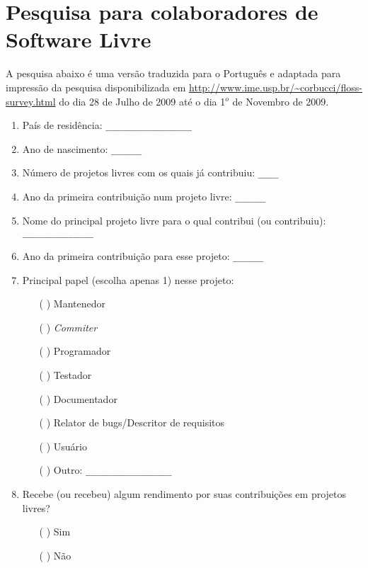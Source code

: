 \chapter{Pesquisa para colaboradores de Software Livre}
\label{ape:OS}

\singlespacing

A pesquisa abaixo é uma versão traduzida para o Português e adaptada
para impressão da pesquisa disponibilizada em
\url{http://www.ime.usp.br/~corbucci/floss-survey.html} do dia 28 de
Julho de 2009 até o dia 1$^o$ de Novembro de 2009.

\begin{enumerate}
\item País de residência: \verb=_________________=

\item Ano de nascimento: \verb=______=

\item Número de projetos livres com os quais já contribuiu:
  \verb=____=

\item Ano da primeira contribuição num projeto livre: \verb=______=

\item Nome do principal projeto livre para o qual contribui (ou
  contribuiu): \verb= ______________=

\item Ano da primeira contribuição para esse projeto: \verb=______=

\item Principal papel (escolha apenas 1) nesse projeto:
  \begin{itemize}
  \item[( )] Mantenedor
  \item[( )] \textit{Commiter}
  \item[( )] Programador
  \item[( )] Testador
  \item[( )] Documentador
  \item[( )] Relator de bugs/Descritor de requisitos
  \item[( )] Usuário
  \item[( )] Outro: \verb=_________________=
  \end{itemize}

\item Recebe (ou recebeu) algum rendimento por suas contribuições em
  projetos livres?
  \begin{itemize}
  \item[( )] Sim
  \item[( )] Não
  \end{itemize}


\end{enumerate}
